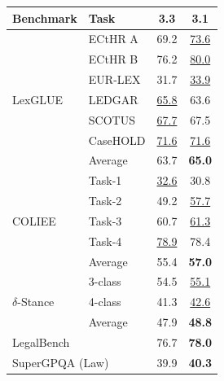 \begin{table}[ht]
  \centering
  \begin{threeparttable}
  \begin{tabular}{llcc}
    \hline
    \textbf{Benchmark} & \textbf{Task} & \textbf{3.3} & \textbf{3.1} \\
    \hline
    \multirow{7}{*}{LexGLUE} & ECtHR A\tnote{$\bigstar$} & 69.2 & \underline{73.6} \\
    & ECtHR B\tnote{$\bigstar$} & 76.2 & \underline{80.0}  \\
    & EUR-LEX\tnote{$\bigstar$} & 31.7 & \underline{33.9}  \\
    & LEDGAR\tnote{$\bigstar$} & \underline{65.8} & 63.6  \\
    & SCOTUS\tnote{$\bigstar$} & \underline{67.7} & 67.5  \\
    & CaseHOLD\tnote{$\S$} & \underline{71.6} & \underline{71.6}  \\
    & Average & 63.7 & \textbf{65.0}  \\
   \hline
   \multirow{5}{*}{COLIEE} & Task-1\tnote{$\bigstar$} & \underline{32.6} & 30.8  \\
    & Task-2\tnote{$\bigstar$} & 49.2 & \underline{57.7}  \\
    & Task-3\tnote{$\triangle$} & 60.7 & \underline{61.3}  \\
    & Task-4\tnote{$\S$} & \underline{78.9} & 78.4  \\
    & Average & 55.4 & \textbf{57.0}  \\
   \hline
   \multirow{3}{*}{$\delta$-Stance\tnote{$\dag$}} & 3-class & 54.5 & \underline{55.1} \\
    & 4-class & 41.3 & \underline{42.6} \\
    & Average & 47.9 & \textbf{48.8} \\
   \hline
   \multicolumn{2}{l}{LegalBench\tnote{$\blacktriangle$}} & 76.7 & \textbf{78.0}  \\
   \hline
   \multicolumn{2}{l}{SuperGPQA (Law)\tnote{$\S$}} & 39.9 & \textbf{40.3}  \\

\end{tabular}
\end{threeparttable}
\end{table}
